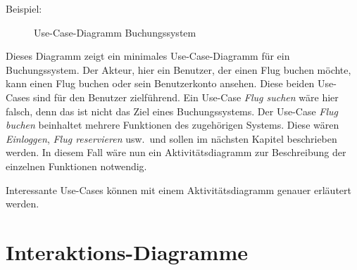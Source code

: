 Beispiel:

\begin{figure}[ht]
\centering
\caption{Use-Case-Diagramm Buchungssystem}
\end{figure}

Dieses Diagramm zeigt ein minimales Use-Case-Diagramm für ein Buchungssystem.
Der Akteur, hier ein Benutzer, der einen Flug buchen möchte, kann einen Flug buchen oder sein Benutzerkonto ansehen.
Diese beiden Use-Cases sind für den Benutzer zielführend.
Ein Use-Case \emph{Flug suchen} wäre hier falsch, denn das ist nicht das Ziel eines Buchungssystems. 
Der Use-Case \emph{Flug buchen} beinhaltet mehrere Funktionen des zugehörigen Systems. 
Diese wären \emph{Einloggen}, \emph{Flug reservieren} usw.\ und sollen im nächsten Kapitel beschrieben werden.
In diesem Fall wäre nun ein Aktivitätsdiagramm zur Beschreibung der einzelnen Funktionen notwendig.


Interessante Use-Cases können mit einem Aktivitätsdiagramm genauer erläutert werden.

\section{Interaktions-Diagramme}
